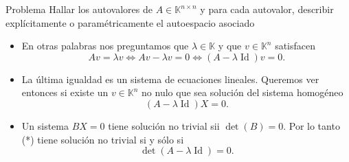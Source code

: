 \documentclass{beamer} %
\newcommand{\Id}{\operatorname{Id}}
\newcommand{\K}{\mathbb K}
\begin{document}
    \begin{frame}
    
    \begin{exampleblock}{Problema}
    Hallar los autovalores de $A\in\K^{n\times n}$ y para cada autovalor, describir explícitamente o paramétricamente el autoespacio asociado
    \end{exampleblock}\pause
    
    \begin{itemize}
        \item En otras palabras nos preguntamos que $\lambda\in\K$ y  que $v\in\K^{n}$ satisfacen
        $$
        A v=\lambda v
        \Longleftrightarrow
        A v-\lambda v=0
        \Longleftrightarrow
        (A-\lambda\Id)v=0 .
        $$\pause
        \item La última igualdad es un sistema de ecuaciones lineales. Queremos ver entonces si existe un $v\in\K^{n}$ no nulo que sea solución del sistema homogéneo
        \begin{equation*}
            (A-\lambda\Id)X=0.\tag{*}
        \end{equation*}\pause
        \item  Un  sistema $BX =0$ tiene solución no trivial sii $\det(B)=0$. Por lo tanto (*) tiene  solución no trivial si y sólo si 
        $$
        \det(A-\lambda\Id)=0.
        $$ 
    \end{itemize}

    \end{frame}


    
\end{document}
